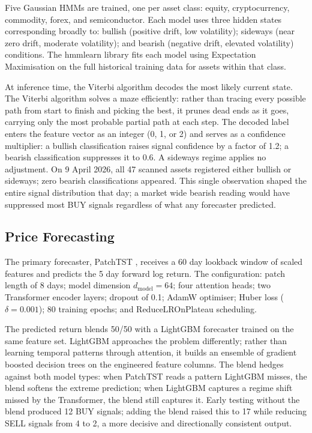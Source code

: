 \documentclass[journal]{IEEEtran}
\begin{document}
Five Gaussian HMMs are trained, one per asset class: equity,
cryptocurrency, commodity, forex, and semiconductor. Each model uses three
hidden states corresponding broadly to: bullish (positive drift, low
volatility); sideways (near zero drift, moderate volatility); and bearish
(negative drift, elevated volatility) conditions. The hmmlearn library
fits each model using Expectation Maximisation on the full historical
training data for assets within that class.

At inference time, the Viterbi algorithm decodes the most likely current
state. The Viterbi algorithm solves a maze efficiently: rather than
tracing every possible path from start to finish and picking the best,
it prunes dead ends as it goes, carrying only the most probable partial
path at each step. The decoded label enters the feature vector as an
integer (0, 1, or 2) and serves as a confidence multiplier: a bullish
classification raises signal confidence by a factor of 1.2; a bearish
classification suppresses it to 0.6. A sideways regime applies no
adjustment. On 9 April 2026, all 47 scanned assets registered either
bullish or sideways; zero bearish classifications appeared. This single
observation shaped the entire signal distribution that day; a
market wide bearish reading would have suppressed most BUY signals
regardless of what any forecaster predicted.

\subsection{Price Forecasting}

The primary forecaster, PatchTST \cite{patchtst}, receives a 60 day
lookback window of scaled features and predicts the 5 day forward log
return. The configuration: patch length of 8 days; model dimension
$d_{\text{model}} = 64$; four attention heads; two Transformer encoder
layers; dropout of 0.1; AdamW optimiser; Huber loss ($\delta = 0.001$);
80 training epochs; and ReduceLROnPlateau scheduling.

The predicted return blends 50/50 with a LightGBM forecaster trained on
the same feature set. LightGBM approaches the problem differently; rather
than learning temporal patterns through attention, it builds an ensemble
of gradient boosted decision trees on the engineered feature columns.
The blend hedges against both model types: when PatchTST reads a pattern
LightGBM misses, the blend softens the extreme prediction; when LightGBM
captures a regime shift missed by the Transformer, the blend still
captures it. Early testing without the blend produced 12 BUY signals;
adding the blend raised this to 17 while reducing SELL signals from 4 to
2, a more decisive and directionally consistent output.
\end{document}
